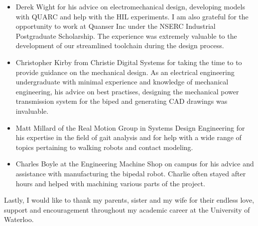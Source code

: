 \begin{itemize}
    \item Derek Wight for his advice on electromechanical design, developing models with QUARC and help with the HIL experiments. I am also grateful for the opportunity to work at Quanser Inc under the NSERC Industrial Postgraduate Scholarship. The experience was extremely valuable to the development of our streamlined toolchain during the design process. \\

    \item Christopher Kirby from Christie Digital Systems for taking the time to to provide guidance on the mechanical design. As an electrical engineering undergraduate with minimal experience and knowledge of mechanical engineering, his advice on best practises, designing the mechanical power transmission system for the biped and generating CAD drawings was invaluable. \\

    \item Matt Millard of the Real Motion Group in Systems Design Engineering for his expertise in the field of gait analysis and for help with a wide range of topics pertaining to walking robots and contact modeling.  \\

    \item Charles Boyle at the Engineering Machine Shop on campus for his advice and assistance with manufacturing the bipedal robot. Charlie often stayed after hours and helped with machining various parts of the project.  \\

\end{itemize}

Lastly, I would like to thank my parents, sister and my wife for their endless love, support and encouragement throughout my academic career at the University of Waterloo. 

\cleardoublepage


\renewcommand\contentsname{Table of Contents}
\tableofcontents
\cleardoublepage
{}


\listoftables
\cleardoublepage
{}		%


\listoffigures
\cleardoublepage
{}		%




